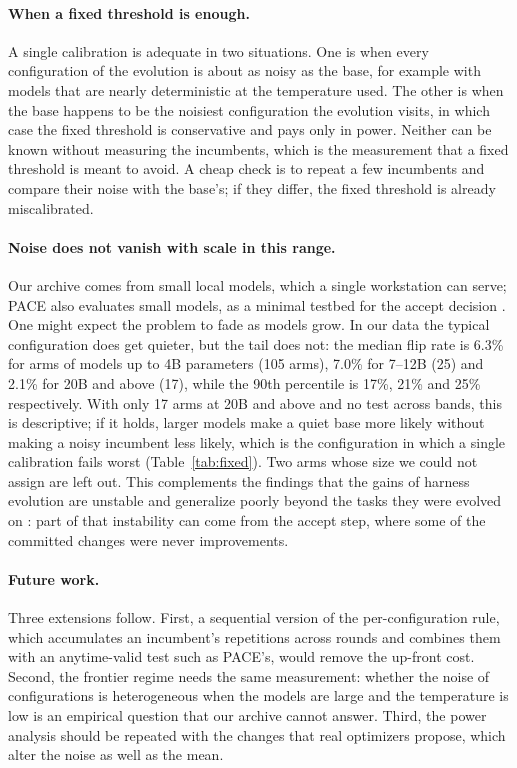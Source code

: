 \paragraph{When a fixed threshold is enough.}
A single calibration is adequate in two situations. One is when every
configuration of the evolution is about as noisy as the base, for example with
models that are nearly deterministic at the temperature used. The other is when
the base happens to be the noisiest configuration the evolution visits, in which
case the fixed threshold is conservative and pays only in power. Neither can be
known without measuring the incumbents, which is the measurement that a fixed
threshold is meant to avoid. A cheap check is to repeat a few incumbents and
compare their noise with the base's; if they differ, the fixed threshold is
already miscalibrated.

\paragraph{Noise does not vanish with scale in this range.}
Our archive comes from small local models, which a single workstation can serve; PACE also evaluates small models, as a minimal testbed for the accept decision \citep{zayxshawn2026pace}. One might expect the problem to fade as models
grow. In our data the typical configuration does get quieter, but the tail does
not: the median flip rate is 6.3\% for arms of models up to 4B parameters (105
arms), 7.0\% for 7--12B (25) and 2.1\% for 20B and above (17), while the 90th
percentile is 17\%, 21\% and 25\% respectively. With only 17 arms at 20B and above and no test across bands, this is descriptive; if it holds, larger models make a quiet base more likely without making a noisy incumbent less likely, which is the configuration in which a single calibration fails worst (Table~\ref{tab:fixed}). Two arms whose size we could not assign are left out. This complements the findings that the gains of harness evolution are unstable \citep{wu2026harnessdev} and generalize poorly beyond the tasks they were evolved on \citep{wu2026harnessdev,wang2026rethinking}:
part of that instability can come from the accept step, where some of the
committed changes were never improvements.

\paragraph{Future work.}
Three extensions follow. First, a sequential version of the per-configuration
rule, which accumulates an incumbent's repetitions across rounds and combines
them with an anytime-valid test such as PACE's, would remove the up-front cost.
Second, the frontier regime needs the same measurement: whether the noise of
configurations is heterogeneous when the models are large and the temperature is
low is an empirical question that our archive cannot answer. Third, the power
analysis should be repeated with the changes that real optimizers propose, which
alter the noise as well as the mean.
